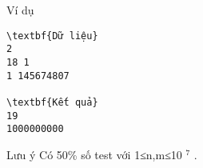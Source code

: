 Ví dụ
\begin{verbatim}
\textbf{Dữ liệu}
2
18 1
1 145674807	

\textbf{Kết quả}
19
1000000000
\end{verbatim}
Lưu ý
Có 50\% số test với 1≤n,m≤10   $^    7   $   .